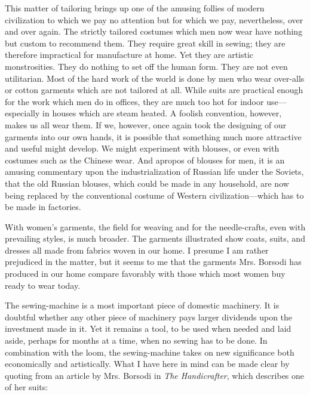 \documentclass{book}
\begin{document}
This matter of tailoring brings up one of the amusing follies of modern civilization to which we pay no attention but for which we pay, nevertheless, over and over again. The strictly tailored costumes which men now wear have nothing but custom to recommend them. They require great skill in sewing; they are therefore impractical for manufacture at home. Yet they are artistic monstrosities. They do nothing to set off the human form. They are not even utilitarian. Most of the hard work of the world is done by men who wear over-alls or cotton garments which are not tailored at all. While suits are practical enough for the work which men do in offices, they are much too hot for indoor use—especially in houses which are steam heated. A foolish convention, however, makes us all wear them. If we, however, once again took the designing of our garments into our own hands, it is possible that something much more attractive and useful might develop. We might experiment with blouses, or even with costumes such as the Chinese wear. And apropos of blouses for men, it is an amusing commentary upon the industrialization of Russian life under the Soviets, that the old Russian blouses, which could be made in any household, are now being replaced by the conventional costume of Western civilization—which has to be made in factories.

With women’s garments, the field for weaving and for the needle-crafts, even with prevailing styles, is much broader. The garments illustrated show coats, suits, and dresses all made from fabrics woven in our home. I presume I am rather prejudiced in the matter, but it seems to me that the garments Mrs. Borsodi has produced in our home compare favorably with those which most women buy ready to wear today.

The sewing-machine is a most important piece of domestic machinery. It is doubtful whether any other piece of machinery pays larger dividends upon the investment made in it. Yet it remains a tool, to be used when needed and laid aside, perhaps for months at a time, when no sewing has to be done. In combination with the loom, the sewing-machine takes on new significance both economically and artistically. What I have here in mind can be made clear by quoting from an article by Mrs. Borsodi in \emph{The Handicrafter}, which describes one of her suits:
\end{document}
